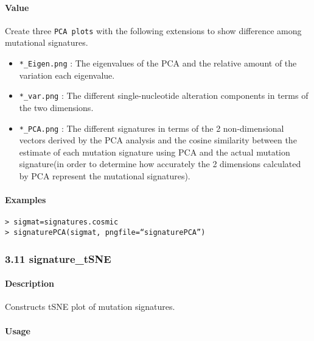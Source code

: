\documentclass[]{article}
\providecommand{\tightlist}{%
  \setlength{\itemsep}{0pt}\setlength{\parskip}{0pt}}
\let\oldparagraph\paragraph
\renewcommand{\paragraph}[1]{\oldparagraph{#1}\mbox{}}
\begin{document}
\paragraph{\texorpdfstring{\textbf{Value}}{Value}}\label{value-7}

Create three \texttt{PCA\ plots} with the following extensions to show
difference among mutational signatures.

\begin{itemize}
\tightlist
\item
  \texttt{*\_Eigen.png} : The eigenvalues of the PCA and the relative
  amount of the variation each eigenvalue.
\item
  \texttt{*\_var.png} : The different single-nucleotide alteration
  components in terms of the two dimensions.
\item
  \texttt{*\_PCA.png} : The different signatures in terms of the 2
  non-dimensional vectors derived by the PCA analysis and the cosine
  similarity between the estimate of each mutation signature using PCA
  and the actual mutation signature(in order to determine how accurately
  the 2 dimensions calculated by PCA represent the mutational
  signatures).
\end{itemize}

\paragraph{\texorpdfstring{\textbf{Examples}}{Examples}}\label{examples-9}

\begin{verbatim}
> sigmat=signatures.cosmic
> signaturePCA(sigmat, pngfile=“signaturePCA”)
\end{verbatim}


\subsubsection{3.11 signature\_tSNE}\label{signaturetsne}

\paragraph{\texorpdfstring{\textbf{Description}}{Description}}\label{description-8}

Constructs tSNE plot of mutation signatures.

\paragraph{\texorpdfstring{\textbf{Usage}}{Usage}}\label{usage-9}
\end{document}
